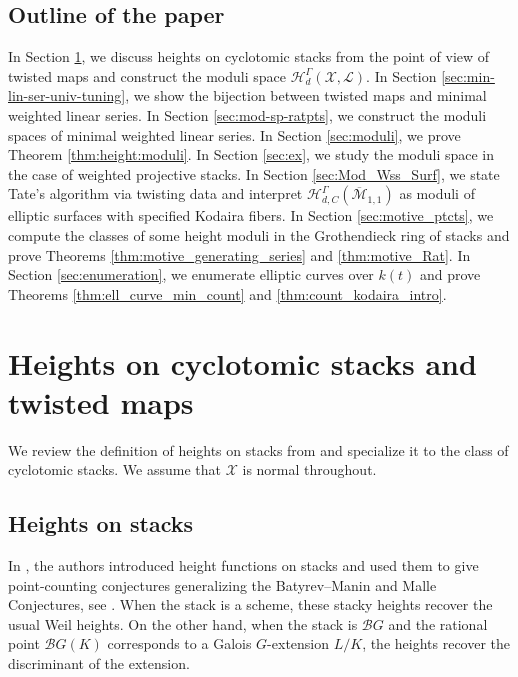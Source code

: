 \documentclass[a4paper,12pt]{amsart}
\theoremstyle{definition}
\newcommand{\cX}{\mathcal{X}}
\newcommand{\cL}{\mathcal{L}}
\newcommand{\cH}{\mathcal{H}}
\newcommand{\Me}{\overline{\mathcal{M}}_{1,1}}
\begin{document}
	\subsection{Outline of the paper} In Section \ref{sec:heights:twisted}, we discuss heights on cyclotomic stacks from the point of view of twisted maps and construct the moduli space $\cH^\Gamma_d(\cX, \cL)$. In Section \ref{sec:min-lin-ser-univ-tuning}, we show the bijection between twisted maps and minimal weighted linear series. In Section \ref{sec:mod-sp-ratpts}, we construct the moduli spaces of minimal weighted linear series. In Section \ref{sec:moduli}, we prove Theorem \ref{thm:height:moduli}. In Section \ref{sec:ex}, we study the moduli space in the case of weighted projective stacks. In Section \ref{sec:Mod_Wss_Surf}, we state Tate's algorithm via twisting data and interpret $\cH^\Gamma_{d, C}(\Me)$ as moduli of elliptic surfaces with specified Kodaira fibers. In Section \ref{sec:motive_ptcts}, we compute the classes of some height moduli in the Grothendieck ring of stacks and prove Theorems \ref{thm:motive_generating_series} and \ref{thm:motive_Rat}. In Section \ref{sec:enumeration}, we enumerate elliptic curves over $k(t)$ and prove Theorems \ref{thm:ell_curve_min_count} and \ref{thm:count_kodaira_intro}. 
	
	
	
	\section{Heights on cyclotomic stacks and twisted maps}\label{sec:heights:twisted}
	
	We review the definition of heights on stacks from \cite{ESZB} and specialize it to the class of cyclotomic stacks. We assume that $\cX$ is normal throughout. 
	
	\subsection{Heights on stacks}\label{sec:heights:stacks}
	
	\par In \cite{ESZB}, the authors introduced height functions on stacks and used them to give point-counting conjectures generalizing the Batyrev--Manin \cite{BM, FMT} and Malle Conjectures, see \cite[Conj. 4.14]{ESZB}. When the stack is a scheme, these stacky heights recover the usual Weil heights. On the other hand, when the stack is $\mathcal{B} G$ and the rational point $\mathcal{B} G(K)$ corresponds to a Galois $G$-extension $L/K$, the heights recover the discriminant of the extension.
	
\end{document}
